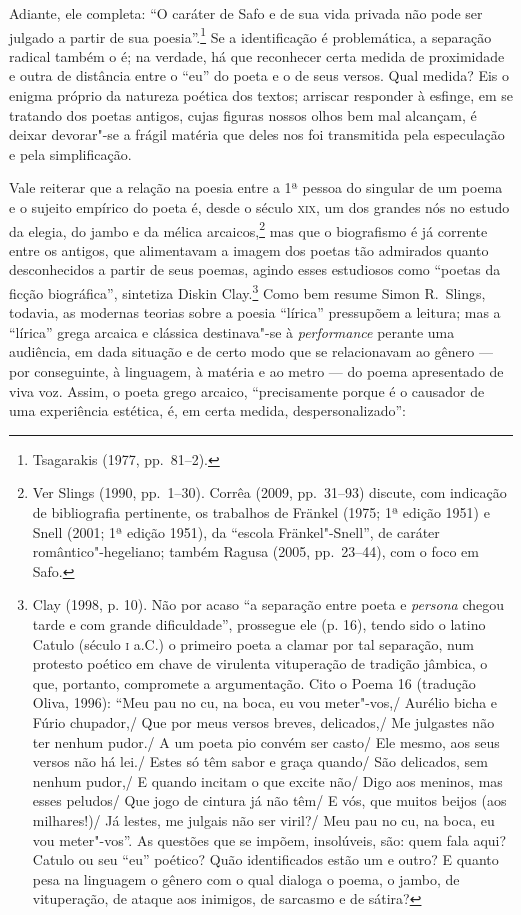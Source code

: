 Adiante, ele completa: “O caráter de Safo e de sua vida privada não pode ser
julgado a partir de sua poesia”.\footnote{ Tsagarakis (1977, pp.~81--2).} Se a identificação é problemática,
a separação radical também o é; na verdade, há que reconhecer certa medida de
proximidade e outra de distância entre o “eu” do poeta e o de seus versos. Qual
medida? Eis o enigma próprio da natureza poética dos textos; arriscar
responder à esfinge, em se tratando dos poetas antigos, cujas figuras nossos
olhos bem mal alcançam, é deixar devorar"-se a frágil matéria que deles nos foi
transmitida pela especulação e pela simplificação.

Vale reiterar que a relação na poesia entre a 1ª pessoa do
singular de um poema e o sujeito empírico do poeta é, desde o século \textsc{xix}, um
dos grandes nós no estudo da elegia, do jambo e da mélica arcaicos,\footnote{
Ver Slings (1990, pp.~1--30). Corrêa (2009, pp.~31--93) discute, com indicação de
bibliografia pertinente, os trabalhos de Fränkel (1975; 1ª edição
1951) e Snell (2001; 1ª edição 1951), da “escola Fränkel"-Snell”, de
caráter romântico"-hegeliano; também Ragusa (2005, pp.~23--44), com o foco em
Safo.} mas que o biografismo é já corrente entre os antigos, que alimentavam a
imagem dos poetas tão admirados quanto desconhecidos a partir de seus poemas,
agindo esses estudiosos como “poetas da ficção biográfica”, sintetiza Diskin
Clay.\footnote{ Clay (1998, p. 10). Não por acaso “a separação entre poeta e
\textit{persona} chegou tarde e com grande dificuldade”, prossegue ele (p. 16),
tendo sido o latino Catulo (século \textsc{i} a.C.) o primeiro poeta a clamar por tal
separação, num protesto poético em chave de virulenta vituperação de tradição
jâmbica, o que, portanto, compromete a argumentação. Cito o Poema 16 (tradução
Oliva, 1996): ``Meu pau no cu, na boca, eu vou meter"-vos,/ Aurélio bicha
e Fúrio chupador,/ Que por meus versos breves, delicados,/ Me julgastes não
ter nenhum pudor./ A um poeta pio convém ser casto/ Ele mesmo, aos seus
versos não há lei./ Estes só têm sabor e graça quando/ São delicados, sem
nenhum pudor,/ E quando incitam o que excite não/ Digo aos meninos, mas esses
peludos/ Que jogo de cintura já não têm/ E vós, que muitos beijos (aos
milhares!)/ Já lestes, me julgais não ser viril?/ Meu pau no cu, na boca, eu
vou meter"-vos''. As questões que se impõem, insolúveis, são: quem fala
aqui? Catulo ou seu “eu” poético? Quão identificados estão um e outro? E quanto
pesa na linguagem o gênero com o qual dialoga o poema, o jambo, de vituperação,
de ataque aos inimigos, de sarcasmo e de sátira?} Como bem resume Simon R.~Slings, 
todavia, as modernas teorias sobre a poesia “lírica”
pressupõem a leitura; mas a “lírica” grega arcaica e clássica destinava"-se à
\textit{performance} perante uma audiência, em dada situação e de certo modo
que se relacionavam ao gênero --- por conseguinte, à linguagem, à matéria e ao
metro --- do poema apresentado de viva voz. Assim, o poeta grego arcaico,
“precisamente porque é o causador de uma experiência estética, é, em certa
medida, despersonalizado”:

